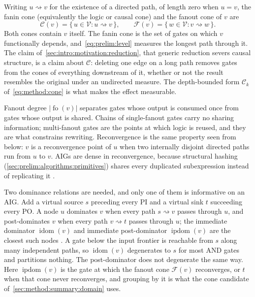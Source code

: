 Writing $u \rightsquigarrow v$ for the existence of a directed path, of length zero when
$u = v$, the fanin cone (equivalently the logic or causal cone) and the fanout cone of $v$
are
\begin{equation}
    \mathcal{C}(v) = \{\, u \in \mathcal{V} : u \rightsquigarrow v \,\},
    \qquad
    \mathcal{F}(v) = \{\, w \in \mathcal{V} : v \rightsquigarrow w \,\}.
    \label{eq:prelim:cone}
\end{equation}
Both cones contain $v$ itself. The fanin cone is the set of gates on which $v$ functionally
depends, and~\eqref{eq:prelim:level} measures the longest path through it. The claim of~\ref{sec:intro:motivation:reduction}, that
generic reduction severs causal structure, is a claim about $\mathcal{C}$: deleting one edge
on a long path removes gates from the cones of everything downstream of it, whether or not the
result resembles the original under an undirected measure. The depth-bounded form
$\mathcal{C}_k$ of~\eqref{eq:method:cone} is what makes the effect measurable.

Fanout degree $|\operatorname{fo}(v)|$ separates gates whose output is consumed once from
gates whose output is shared. Chains of single-fanout gates carry no sharing information;
multi-fanout gates are the points at which logic is reused, and they are what constrains
rewriting. Reconvergence is the same property seen from below: $v$ is a reconvergence point
of $u$ when two internally disjoint directed paths run from $u$ to $v$. AIGs are dense in
reconvergence, because structural hashing (\ref{sec:prelim:algorithms:primitives}) shares
every duplicated subexpression instead of replicating it \citep{kuehlmann2002robust}.

Two dominance relations are needed, and only one of them is informative on an AIG\@. Add a
virtual source $s$ preceding every PI and a virtual sink $t$ succeeding every PO\@. A node
$u$ dominates $v$ when every path $s \rightsquigarrow v$ passes through $u$, and
post-dominates $v$ when every path $v \rightsquigarrow t$ passes through $u$; the immediate
dominator $\operatorname{idom}(v)$ and immediate post-dominator
$\operatorname{ipdom}(v)$ are the closest such nodes \citep{lengauer1979dominators}. A gate below the input frontier is
reachable from $s$ along many independent paths, so $\operatorname{idom}(v)$ degenerates to
$s$ for most AND gates and partitions nothing. The post-dominator does not degenerate the
same way. Here $\operatorname{ipdom}(v)$ is the gate at which the fanout cone
$\mathcal{F}(v)$ reconverges, or $t$ when that cone never reconverges, and grouping by it
is what the cone candidate of~\ref{sec:method:summary:domain} uses.

